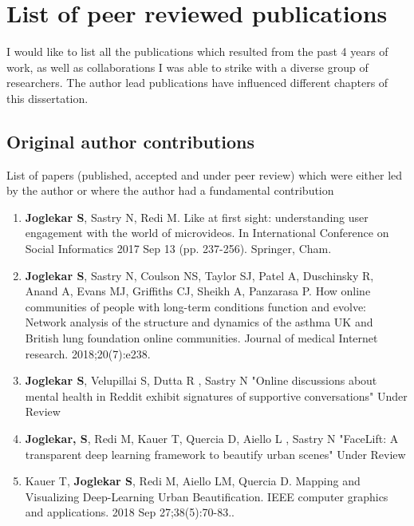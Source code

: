 \section{List of peer reviewed publications}

I would like to list all the publications which resulted from the past 4 years of work, as well as collaborations I was able to strike with a diverse group of researchers. The author lead publications have influenced different chapters of this dissertation.

\subsection{Original author contributions}
List of papers (published, accepted and under peer review) which were either led by the author or where the author had a fundamental contribution

\begin{enumerate}
    \item \label{vinePaper} \textbf{Joglekar S}, Sastry N, Redi M. Like at first sight: understanding user engagement with the world of microvideos. In International Conference on Social Informatics 2017 Sep 13 (pp. 237-256). Springer, Cham.
    
    \item \label{JMIR} \textbf{Joglekar S}, Sastry N, Coulson NS, Taylor SJ, Patel A, Duschinsky R, Anand A, Evans MJ, Griffiths CJ, Sheikh A, Panzarasa P. How online communities of people with long-term conditions function and evolve: Network analysis of the structure and dynamics of the asthma UK and British lung foundation online communities. Journal of medical Internet research. 2018;20(7):e238.
    
    \item \label{SREP} \textbf{Joglekar S}, Velupillai S, Dutta R , Sastry N "Online discussions about mental health in Reddit exhibit signatures of supportive conversations" Under Review
    
    \item \label{RSOS} \textbf{Joglekar, S}, Redi M, Kauer T, Quercia D, Aiello L , Sastry N "FaceLift: A transparent deep learning framework to beautify urban scenes" Under Review
    
    \item \label{IEEE} Kauer T, \textbf{Joglekar S}, Redi M, Aiello LM, Quercia D. Mapping and Visualizing Deep-Learning Urban Beautification. IEEE computer graphics and applications. 2018 Sep 27;38(5):70-83..
    
\end{enumerate}

